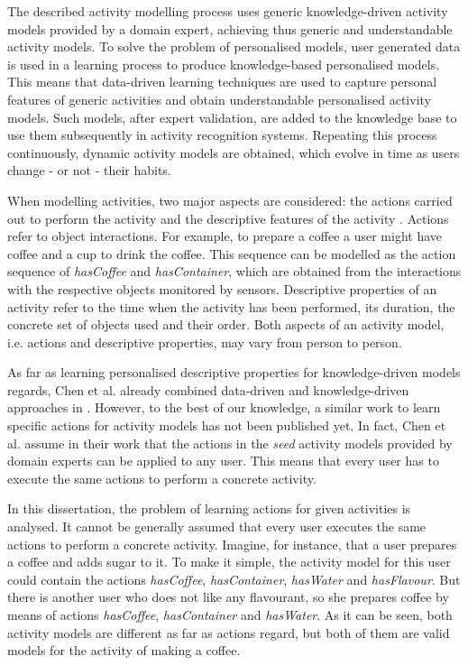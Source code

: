 The described activity modelling process uses generic knowledge-driven activity models provided by a domain expert, achieving thus generic and understandable activity models. To solve the problem of personalised models, user generated data is used in a learning process to produce knowledge-based personalised models. This means that data-driven learning techniques are used to capture personal features of generic activities and obtain understandable personalised activity models. Such models, after expert validation, are added to the knowledge base to use them subsequently in activity recognition systems. Repeating this process continuously, dynamic activity models are obtained, which evolve in time as users change - or not - their habits.


When modelling activities, two major aspects are considered: the actions carried out to perform the activity and the descriptive features of the activity \cite{Chen2014}. Actions refer to object interactions. For example, to prepare a coffee a user might have coffee and a cup to drink the coffee. This sequence can be modelled as the action sequence of \textit{hasCoffee} and \textit{hasContainer}, which are obtained from the interactions with the respective objects monitored by sensors. Descriptive properties of an activity refer to the time when the activity has been performed, its duration, the concrete set of objects used and their order. Both aspects of an activity model, i.e. actions and descriptive properties, may vary from person to person. 

As far as learning personalised descriptive properties for knowledge-driven models regards, Chen et al. already combined data-driven and knowledge-driven approaches in \cite{Chen2014}. However, to the best of our knowledge, a similar work to learn specific actions for activity models has not been published yet. In fact, Chen et al. assume in their work that the actions in the \textit{seed} activity models provided by domain experts can be applied to any user. This means that every user has to execute the same actions to perform a concrete activity.

In this dissertation, the problem of learning actions for given activities is analysed. It cannot be generally assumed that every user executes the same actions to perform a concrete activity. Imagine, for instance, that a user prepares a coffee and adds sugar to it. To make it simple, the activity model for this user could contain the actions \textit{hasCoffee}, \textit{hasContainer}, \textit{hasWater} and \textit{hasFlavour}. But there is another user who does not like any flavourant, so she prepares coffee by means of actions \textit{hasCoffee}, \textit{hasContainer} and  \textit{hasWater}. As it can be seen, both activity models are different as far as actions regard, but both of them are valid models for the activity of making a coffee. 

